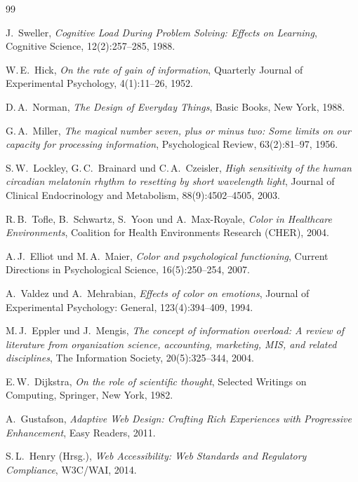 ﻿\documentclass[a4paper,12pt]{article}
\theoremstyle{definition}
\begin{document}
\begin{thebibliography}{99}

J.~Sweller,
\textit{Cognitive Load During Problem Solving: Effects on Learning},
Cognitive Science, 12(2):257--285, 1988.

W.\,E.~Hick,
\textit{On the rate of gain of information},
Quarterly Journal of Experimental Psychology, 4(1):11--26, 1952.

D.\,A.~Norman,
\textit{The Design of Everyday Things},
Basic Books, New York, 1988.

G.\,A.~Miller,
\textit{The magical number seven, plus or minus two: Some limits on our capacity for processing information},
Psychological Review, 63(2):81--97, 1956.

S.\,W.~Lockley, G.\,C.~Brainard und C.\,A.~Czeisler,
\textit{High sensitivity of the human circadian melatonin rhythm to resetting by short wavelength light},
Journal of Clinical Endocrinology and Metabolism, 88(9):4502--4505, 2003.

R.\,B.~Tofle, B.~Schwartz, S.~Yoon und A.~Max-Royale,
\textit{Color in Healthcare Environments},
Coalition for Health Environments Research (CHER), 2004.

A.\,J.~Elliot und M.\,A.~Maier,
\textit{Color and psychological functioning},
Current Directions in Psychological Science, 16(5):250--254, 2007.

A.~Valdez und A.~Mehrabian,
\textit{Effects of color on emotions},
Journal of Experimental Psychology: General, 123(4):394--409, 1994.

M.\,J.~Eppler und J.~Mengis,
\textit{The concept of information overload: A review of literature from organization science, accounting, marketing, MIS, and related disciplines},
The Information Society, 20(5):325--344, 2004.

E.\,W.~Dijkstra,
\textit{On the role of scientific thought},
Selected Writings on Computing, Springer, New York, 1982.

A.~Gustafson,
\textit{Adaptive Web Design: Crafting Rich Experiences with Progressive Enhancement},
Easy Readers, 2011.

S.\,L.~Henry (Hrsg.),
\textit{Web Accessibility: Web Standards and Regulatory Compliance},
W3C/WAI, 2014.


\end{thebibliography}
\end{document}
